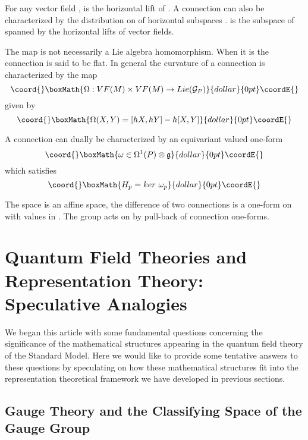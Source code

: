 \documentclass[a4paper,a4paper]{article}
\theoremstyle{conjecture}
\begin{document}
For any vector field \coordHE{}, \coordHE{} is the horizontal lift of \coordHE{}.  A connection can
also be characterized by the distribution on \coordHE{} of horizontal subspaces \coordHE{}. \coordHE{} is the subspace of
\coordHE{} spanned by the horizontal lifts of vector fields.

The map \coordHE{} is not necessarily a Lie algebra homomorphism.  When it is the connection is said to be flat. In
general the curvature \myHighlight{$\Omega$}\coordHE{} of a connection is characterized by the map
$$\coord{}\boxMath{\Omega :VF(M)\times VF(M) \rightarrow Lie ({\mathcal G}_P)}{dollar}{0pt}\coordE{}$$
given by
$$\coord{}\boxMath{\Omega (X,Y)=[hX,hY]-h[X,Y]}{dollar}{0pt}\coordE{}$$

A connection can dually be characterized by an equivariant \coordHE{} valued one-form 
$$\coord{}\boxMath{\omega \in \Omega^1(P)\otimes\mathfrak g}{dollar}{0pt}\coordE{}$$
which satisfies
$$\coord{}\boxMath{H_p=ker \ \omega _p}{dollar}{0pt}\coordE{}$$

The space \coordHE{} is an affine space, the difference of two connections is a one-form
on \coordHE{} with values in \coordHE{}.  The group \coordHE{} acts on \coordHE{} by
pull-back of connection one-forms.

\section{Quantum Field Theories and Representation Theory: Speculative Analogies}

We began this article with some fundamental questions concerning the significance of the
mathematical structures appearing in the quantum field theory of the Standard Model. Here
we would like to provide some tentative answers to these questions by speculating on
how these mathematical structures fit into the representation theoretical framework
we have developed in previous sections.

\subsection{Gauge Theory and the Classifying Space of the Gauge Group}
\end{document}
